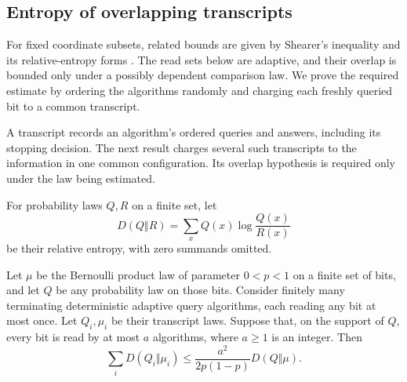 \subsection{Entropy of overlapping transcripts}

For fixed coordinate subsets, related bounds are given by Shearer's
inequality \cite{ChungGrahamFranklShearer1986} and its relative-entropy
forms \cite[Section~IX]{MadimanTetali2010}. The read sets below are
adaptive, and their overlap is bounded only under a possibly dependent
comparison law.
We prove the required estimate by ordering the algorithms randomly
and charging each freshly queried bit to a common transcript.

A transcript records an algorithm's ordered queries and answers,
including its stopping decision. The next result charges several such
transcripts to the information in one common configuration. Its
overlap hypothesis is required only under the law being estimated.

For probability laws $Q,R$ on a finite set, let
\[
 D(Q\Vert R)=\sum_x Q(x)\log\frac{Q(x)}{R(x)}
\]
be their relative entropy, with zero summands omitted.

\begin{lemma}\label{lem:entropy}
Let $\mu$ be the Bernoulli product law of parameter $0<p<1$ on
a finite set of bits, and let $Q$ be any probability law on those bits.
Consider finitely many terminating deterministic adaptive query algorithms, each
reading any bit at most once. Let $Q_i,\mu_i$ be their transcript
laws. Suppose that, on the support of $Q$, every bit is read by at
most $a$ algorithms, where $a\ge1$ is an integer. Then
\[
 \sum_iD(Q_i\Vert\mu_i)
 \le\frac{a^2}{2p(1-p)}D(Q\Vert\mu).
\]
\end{lemma}

